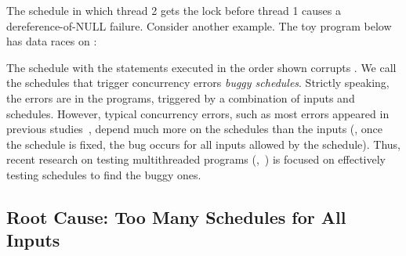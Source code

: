 \noindent The schedule in which thread 2
gets the lock before thread 1 causes a dereference-of-NULL failure.  Consider
another example.  The toy program below has data races on :

\hspace{1.5in}
\begin{minipage}{0.5\columnwidth}
\end{minipage}

\noindent The schedule with the statements
executed in the order shown corrupts . We call the schedules that
trigger concurrency errors \emph{buggy schedules}.  Strictly speaking, the
errors are in the programs, triggered by a combination of inputs and schedules. 
However, typical concurrency errors, such as most errors appeared in previous
studies~\cite{lu:concurrency-bugs,con:hotpar12}, depend much more on the
schedules than the inputs (\eg, once the schedule is fixed, the bug
occurs for all inputs allowed by the schedule).  Thus, recent research on
testing multithreaded programs (\eg,~\cite{musuvathi:chess:osdi08}) is
focused on effectively testing schedules to find the buggy ones.

\subsection{Root Cause: Too Many Schedules for All Inputs}

